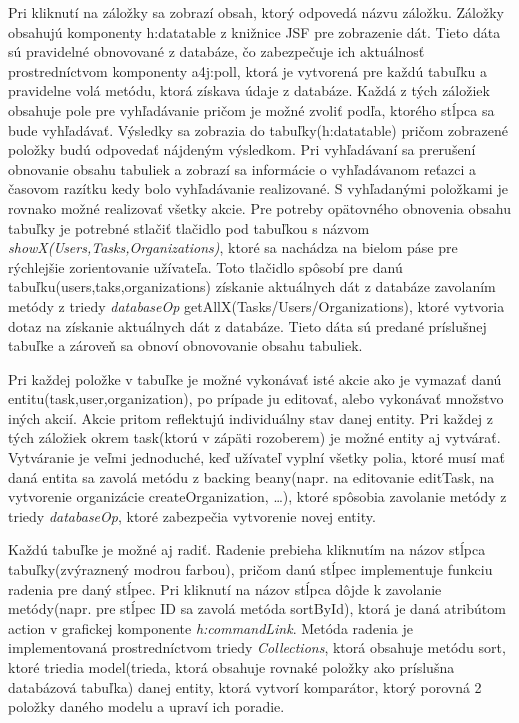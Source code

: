 Pri kliknutí na záložky sa zobrazí obsah, ktorý odpovedá názvu záložku. Záložky  obsahujú komponenty h:datatable z knižnice JSF pre zobrazenie dát. Tieto dáta sú pravidelné obnovované z databáze, čo zabezpečuje ich aktuálnosť prostredníctvom komponenty a4j:poll, ktorá je vytvorená pre každú tabuľku a pravidelne volá metódu, ktorá získava údaje z databáze. Každá z tých záložiek obsahuje pole pre vyhľadávanie pričom je možné zvoliť podľa, ktorého stĺpca sa bude vyhľadávať. Výsledky sa zobrazia do tabuľky(h:datatable) pričom zobrazené položky budú odpovedať nájdeným výsledkom. Pri vyhľadávaní sa prerušení obnovanie obsahu tabuliek a zobrazí sa informácie o vyhľadávanom reťazci a časovom razítku kedy bolo vyhľadávanie realizované. S vyhľadanými položkami je rovnako možné realizovať všetky akcie. Pre potreby opätovného obnovenia obsahu tabuľky je potrebné stlačiť tlačidlo pod tabuľkou s názvom \emph{showX(Users,Tasks,Organizations)}, ktoré sa nachádza na bielom páse pre rýchlejšie zorientovanie užívateľa. Toto tlačidlo spôsobí pre danú tabuľku(users,taks,organizations) získanie aktuálnych dát z databáze zavolaním metódy z triedy \emph{databaseOp} getAllX(Tasks/Users/Organizations), ktoré vytvoria dotaz na získanie aktuálnych dát z databáze. Tieto dáta sú predané príslušnej tabuľke a zároveň sa obnoví obnovovanie obsahu tabuliek.

 Pri každej položke v tabuľke je možné vykonávať isté akcie ako je vymazať danú entitu(task,user,organization), po prípade ju editovať, alebo vykonávať množstvo iných akcií. Akcie pritom reflektujú individuálny stav danej entity. Pri každej z tých záložiek okrem task(ktorú v zápäti rozoberem) je možné entity aj vytvárať. Vytváranie je veľmi jednoduché, keď užívateľ vyplní všetky polia, ktoré musí mať daná entita sa zavolá metódu z backing beany(napr. na editovanie editTask, na vytvorenie organizácie createOrganization, \ldots), ktoré spôsobia zavolanie metódy z triedy \emph{databaseOp}, ktoré zabezpečia vytvorenie novej entity. 

 Každú tabuľke je možné aj radiť. Radenie prebieha kliknutím na názov stĺpca tabuľky(zvýraznený modrou farbou), pričom danú stĺpec implementuje funkciu radenia pre daný stĺpec. Pri kliknutí na názov stĺpca dôjde k zavolanie metódy(napr. pre stĺpec ID sa zavolá metóda sortById), ktorá je daná atribútom action v grafickej komponente \emph{h:commandLink}. Metóda radenia je implementovaná prostredníctvom triedy \emph{Collections}, ktorá obsahuje metódu sort, ktoré triedia model(trieda, ktorá obsahuje rovnaké položky ako príslušna databázová tabuľka) danej entity, ktorá vytvorí komparátor, ktorý porovná 2 položky daného modelu a upraví ich poradie.


